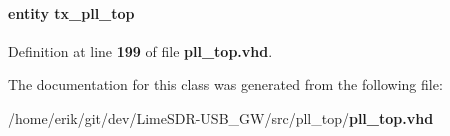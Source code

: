 \paragraph[{tx\+\_\+pll\+\_\+top\+\_\+inst0}]{ {\bfseries \textcolor{keywordflow}{entity}\textcolor{vhdlchar}{ }\textcolor{vhdlchar}{tx\+\_\+pll\+\_\+top}\textcolor{vhdlchar}{ }} \hspace{0.3cm}{\ttfamily [Instantiation]}}\label{classpll__top_1_1arch_a831c95f4be5cc02372372cdefc84b6d0}


Definition at line {\bf 199} of file {\bf pll\+\_\+top.\+vhd}.



The documentation for this class was generated from the following file\+:\begin{DoxyCompactItemize}
\item 
/home/erik/git/dev/\+Lime\+S\+D\+R-\/\+U\+S\+B\+\_\+\+G\+W/src/pll\+\_\+top/{\bf pll\+\_\+top.\+vhd}\end{DoxyCompactItemize}
